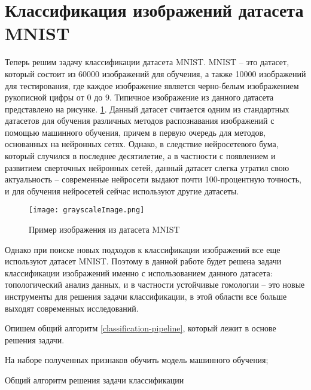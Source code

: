 \section{Классификация изображений датасета MNIST}

Теперь решим задачу классификации датасета MNIST. MNIST -- это датасет, который состоит из 60000 изображений для обучения, а также 10000 изображений для тестирования, где каждое изображение является черно-белым изображением рукописной цифры от $0$ до $9$. Типичное изображение из данного датасета представлено на рисунке. \ref{mnist-example}. Данный датасет считается одним из стандартных датасетов для обучения различных методов распознавания изображений с помощью машинного обучения, причем в первую очередь для методов, основанных на нейронных сетях. Однако, в следствие нейросетевого бума, который случился в последнее десятилетие, а в частности с появлением и развитием сверточных нейронных сетей, данный датасет слегка утратил свою актуальность -- современные нейросети выдают почти 100-процентную точность, и для обучения нейросетей сейчас используют другие датасеты. 

\begin{figure}[!htbp]
	\begin{center}
		\texttt{[image: grayscaleImage.png]}\\
		\caption{Пример изображения из датасета MNIST}
		\label{mnist-example}
	\end{center}
\end{figure}

Однако при поиске новых подходов к классификации изображений все еще используют датасет MNIST. Поэтому в данной работе будет решена задачи классификации изображений именно с использованием данного датасета: топологический анализ данных, и в частности устойчивые гомологии -- это новые инструменты для решения задачи классификации, в этой области все больше выходят современных исследований.

Опишем общий алгоритм \ref{classification-pipeline}, который лежит в основе решения задачи.

\medskip
\begin{algorithm}[H]
	\small
	\SetAlgoLined
	
	На наборе полученных признаков обучить модель машинного обучения;
	\caption{Общий алгоритм решения задачи классификации}
	\label{classification-pipeline}
\end{algorithm}
\medskip


